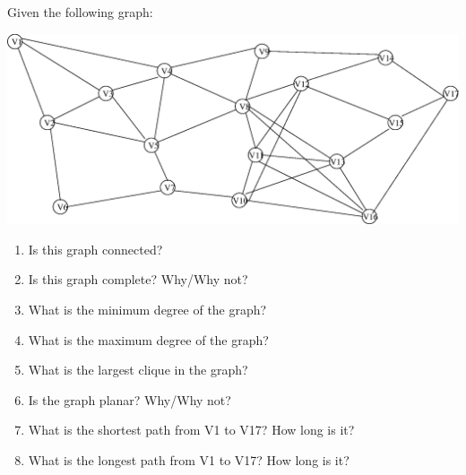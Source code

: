 \documentclass[10pt]{article}
\newenvironment{solution}[2][Solution]{ \begin{trivlist}
\item[\hskip \labelsep {\bfseries #1}]}{\end{trivlist}}
\newenvironment{problem}[2][Problem]{\begin{trivlist}
\item[\hskip \labelsep {\bfseries #1}\hskip \labelsep {\bfseries #2.}]}{\end{trivlist}}
\begin{document}
\begin{solution}{3}
\begin{enumerate}[label=(\alph*)]
\end{enumerate}
\end{solution}

\vskip 0.5in
\newpage
\pagebreak
\pagebreak\newpage

\begin{problem}{4} Given the following graph:

\begin{center}
\includegraphics[scale=0.7]{graph.eps}
\end{center}
\begin{enumerate}[label=(\alph*)]
    \parskip=0in
    \parsep=0in
    \itemsep=0.1in
    \item Is this graph connected?
    \item Is this graph complete?  Why/Why not?
    \item What is the minimum degree of the graph?
    \item What is the maximum degree of the graph?
    \item What is the largest clique in the graph?
    \item Is the graph planar? Why/Why not?
    \item What is the shortest path from V1 to V17? How long is it?
    \item What is the longest path from V1 to V17?  How long is it?
\end{enumerate}
\end{problem}
\end{document}
